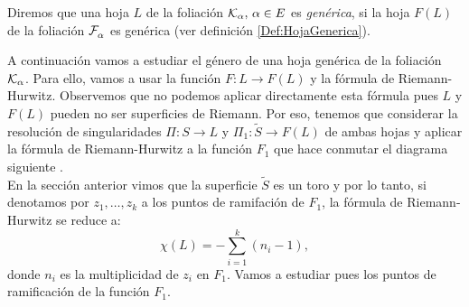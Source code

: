 \begin{defn}
\label{Def:HojaKGenerica}
Diremos que una hoja $L$ de la foliación $\mathcal{K}_{\alpha},\, \alpha\in E$ es \emph{genérica}, si la hoja $F(L)$ de la foliación $\mathcal{F}^{\ }_{\alpha}$ es genérica (ver definición \ref{Def:HojaGenerica}). 
\end{defn}

A continuación vamos a estudiar el género de una hoja genérica de la foliación $\mathcal{K}_{\alpha}$. Para ello, vamos a usar la función $F\colon L\rightarrow F(L)$ y la fórmula de Riemann-Hurwitz. Observemos que no podemos aplicar directamente esta fórmula pues $L$ y $F(L)$ pueden no ser superficies de Riemann. Por eso, tenemos que considerar la resolución de singularidades $\Pi\colon S\rightarrow L$ y $\Pi_{1}\colon \tilde{S}\rightarrow F(L)$ de ambas hojas y aplicar la fórmula de Riemann-Hurwitz a la función $F_{1}$ que hace conmutar el diagrama siguiente .\\

En la sección anterior vimos que la superficie $\tilde{S}$ es un toro y por lo tanto, si denotamos por $z_{1},\ldots,z_{k}$ a los puntos de ramifación de $F_{1}$, la fórmula de Riemann-Hurwitz se reduce a:
\begin{equation}
\label{For:RiemannToro}
\chi(L)=-\sum_{i=1}^{k}(n_{i}-1),
\end{equation}
\noindent donde $n_{i}$ es la multiplicidad de $z_{i}$ en $F_{1}$. Vamos a estudiar pues los puntos de ramificación de la función $F_{1}$.\\

